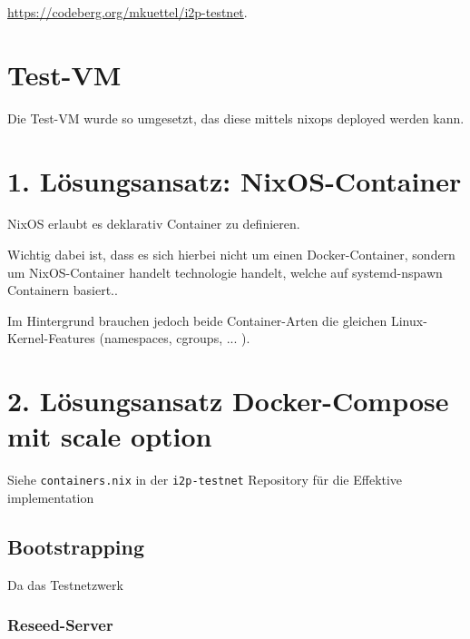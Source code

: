\url{https://codeberg.org/mkuettel/i2p-testnet}.

\section{Test-VM}

Die Test-VM wurde so umgesetzt, das diese mittels nixops deployed werden kann.

\section{1. Lösungsansatz: NixOS-Container}

NixOS erlaubt es deklarativ Container zu definieren.

%

Wichtig dabei ist, dass es sich hierbei nicht um einen Docker-Container, sondern um NixOS-Container handelt technologie handelt, welche auf systemd-nspawn Containern basiert..

Im Hintergrund brauchen jedoch beide Container-Arten die gleichen Linux-Kernel-Features (namespaces, cgroups, ... ).

\section{2. Lösungsansatz Docker-Compose mit scale option}


Siehe \lstinline|containers.nix| in der \lstinline|i2p-testnet| Repository für die Effektive implementation

\subsection{Bootstrapping}

Da das Testnetzwerk

\subsubsection{Reseed-Server}

